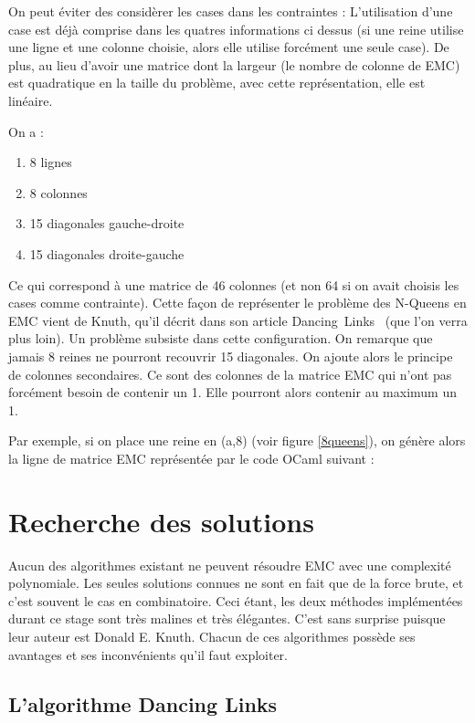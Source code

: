 \documentclass[a4paper]{article}
\begin{document}
On peut éviter des considèrer les cases dans les contraintes : L'utilisation
d'une case est déjà comprise dans les quatres informations ci dessus (si une
reine utilise une ligne et une colonne choisie, alors elle utilise
forcément une seule case).
De plus, au lieu d'avoir une matrice dont la largeur 
(le nombre de colonne de EMC) est
quadratique en la taille du problème, avec cette représentation, elle est
linéaire.

On a : 
\begin{enumerate}
\item 8 lignes
\item 8 colonnes
\item 15 diagonales gauche-droite
\item 15 diagonales droite-gauche
\end{enumerate}

Ce qui correspond à une matrice de 46 colonnes (et non 64 si on avait choisis
les cases comme contrainte).
Cette façon de représenter le problème des N-Queens en EMC vient de Knuth, qu'il
décrit dans son article Dancing~Links~\cite{dlx} (que l'on verra plus loin). 
Un problème subsiste dans cette configuration. On remarque que jamais 8 reines
ne pourront recouvrir 15 diagonales. On ajoute alors le principe de colonnes 
secondaires. Ce sont des colonnes de la matrice EMC qui n'ont pas forcément
besoin de contenir un 1. Elle pourront alors contenir au maximum un 1.

Par exemple, si on place une reine en (a,8) (voir figure \ref{8queens}), on 
génère alors la ligne de matrice EMC représentée par le code OCaml suivant : 




\section{Recherche des solutions}

Aucun des algorithmes existant ne peuvent résoudre EMC
avec une complexité polynomiale. Les seules solutions connues ne sont en fait
que de la force brute, et c'est souvent le cas en combinatoire.
Ceci étant, les deux méthodes implémentées durant ce stage sont 
très malines et très élégantes. C'est sans surprise puisque leur auteur est 
Donald E. Knuth.
Chacun de ces algorithmes possède ses avantages et ses inconvénients qu'il faut 
exploiter.

\subsection{L'algorithme Dancing Links}
\end{document}
